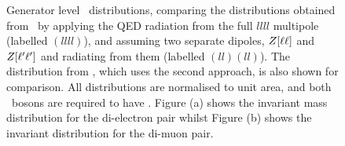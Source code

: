 \begin{figure}
\centering
        \vspace{-5mm}
        \vspace{-2mm}
    \caption[Generator level \mZ\ distributions,
    comparing the distributions obtained from \sherpa\ by applying the QED
    radiation from the full $llll$ multipole, and assuming two
    separate dipoles, $ \Z(\ell\ell) $ and $\Z(\ell'\ell')$ and radiating from
    them.]{ \small Generator level \mZ\ distributions,
    comparing the distributions obtained from \sherpa\ by applying the QED
    radiation from the full $llll$ multipole (labelled $(llll)$), and assuming two
    separate dipoles, $Z[\ell\ell]$ and $Z[\ell'\ell']$ and radiating from
    them (labelled $(ll)(ll)$). The distribution from \powhegbox, which uses the
    second approach, is also shown for comparison. All distributions are
    normalised to unit area, and both \Z\ bosons are required to have \sstooos. Figure (a)
    shows the invariant mass distribution for the di-electron pair whilst Figure 
    (b) shows the invariant distribution for the di-muon pair.
}
    \label{fig:gen-comp-SherpaQED}
\end{figure}



